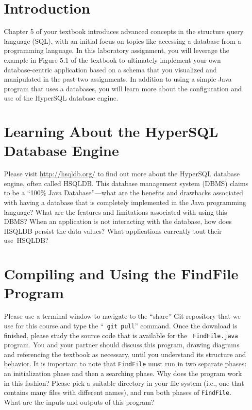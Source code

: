 


\usepackage[compact]{titlesec}



\section*{Introduction}

Chapter 5 of your textbook introduces advanced concepts in the structure query language (SQL), with an initial focus on
topics like accessing a database from a programming language. In this laboratory assignment, you will leverage the
example in Figure 5.1 of the textbook to ultimately implement your own database-centric application based on a schema
that you visualized and manipulated in the past two assignments. In addition to using a simple Java program that uses a
databases, you will learn more about the configuration and use of the HyperSQL database engine.

\vspace*{-.05in}
\section*{Learning About the HyperSQL Database Engine}

Please visit \url{http://hsqldb.org/} to find out more about the HyperSQL database engine, often called HSQLDB. This
database management system (DBMS) claims to be a ``100\% Java Database''---what are the benefits and drawbacks
associated with having a database that is completely implemented in the Java programming language? What are the features
and limitations associated with using this DBMS? When an application is not interacting with the database, how does
HSQLDB persist the data values? What applications currently tout their \mbox{use HSQLDB}?

\vspace*{-.05in}
\section*{Compiling and Using the FindFile Program}

Please use a terminal window to navigate to the ``share'' Git repository that we use for this course and type the ``{\tt
  git pull}'' command. Once the download is finished, please study the source code that is available for the {\tt
  FindFile.java} program.  You and your partner should discuss this program, drawing diagrams and referencing the
textbook as necessary, until you understand its structure and behavior. It is important to note that {\tt FindFile} must
run in two separate phases: an initialization phase and then a searching phase. Why does the program work in this fashion?
Please pick a suitable directory in your file system (i.e., one that contains many files with different names), and run
both phases of {\tt FindFile}. What are the inputs and outputs of this program?

